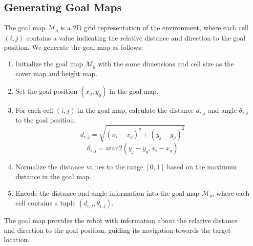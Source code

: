 \subsection{Generating Goal Maps}
The goal map $\mathcal{M}_g$ is a 2D grid representation of the environment, where each cell $(i, j)$ contains a value indicating the relative distance and direction to the goal position. We generate the goal map as follows:
\begin{enumerate}
    \item Initialize the goal map $\mathcal{M}_g$ with the same dimensions and cell size as the cover map and height map.
    \item Set the goal position $(x_g, y_g)$ in the goal map.
    \item For each cell $(i, j)$ in the goal map, calculate the distance $d_{i,j}$ and angle $\theta_{i,j}$ to the goal position:
    \begin{equation}
    d_{i,j} = \sqrt{(x_i - x_g)^2 + (y_j - y_g)^2}
    \end{equation}
    \begin{equation}
    \theta_{i,j} = \text{atan2}(y_j - y_g, x_i - x_g)
    \end{equation}
    \item Normalize the distance values to the range $[0, 1]$ based on the maximum distance in the goal map.
    \item Encode the distance and angle information into the goal map $\mathcal{M}_g$, where each cell contains a tuple $(d_{i,j}, \theta_{i,j})$.
\end{enumerate}
The goal map provides the robot with information about the relative distance and direction to the goal position, guiding its navigation towards the target location.








